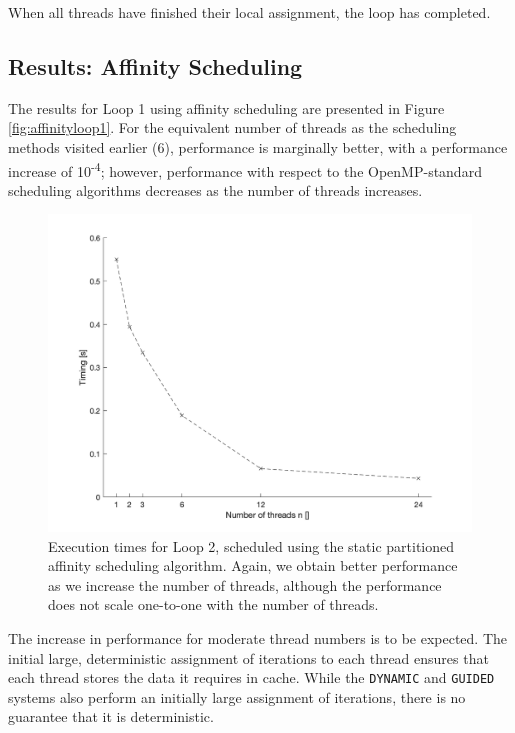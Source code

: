 \documentclass{article} %
\newcommand{\tp}{\texttt}
\begin{document}
When all threads have finished their local assignment, the loop has completed.

\subsection*{Results: Affinity Scheduling}

The results for Loop 1 using affinity scheduling are presented in Figure \ref{fig:affinityloop1}. 
For the equivalent number of threads as the scheduling methods visited earlier (6), performance is marginally better, with a performance increase of 10\textsuperscript{-4}; however, performance with respect to the OpenMP-standard scheduling algorithms decreases as the number of threads increases.

\begin{figure}
    \centering
    \includegraphics[height=.35\textheight]{part2_plots/affinity_loop2}
    \caption{Execution times for Loop 2, scheduled using the static partitioned affinity scheduling algorithm. Again, we obtain better performance as we increase the number of threads, although the performance does not scale one-to-one with the number of threads.}
    \label{fig:affinityloop2}
\end{figure}

The increase in performance for moderate thread numbers is to be expected.
The initial large, deterministic assignment of iterations to each thread ensures that each thread stores the data it requires in cache.
While the \tp{DYNAMIC} and \tp{GUIDED} systems also perform an initially large assignment of iterations, there is no guarantee that it is deterministic.
\end{document}
